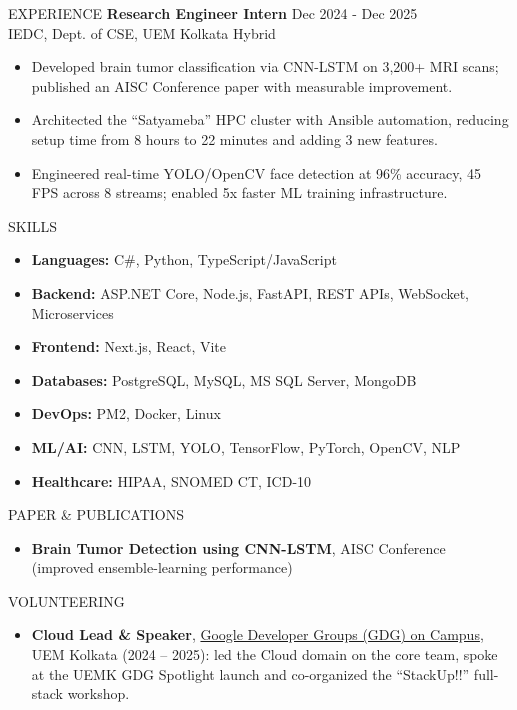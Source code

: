 \documentclass{resume}
\begin{document}
\begin{rSection}{EXPERIENCE}
{\bf Research Engineer Intern} \hfill {Dec 2024 - Dec 2025}\\
IEDC, Dept. of CSE, UEM Kolkata \hfill {Hybrid}
\begin{itemize}
  \item Developed brain tumor classification via CNN-LSTM on 3,200+ MRI scans; published an AISC Conference paper with measurable improvement.
  \item Architected the ``Satyameba'' HPC cluster with Ansible automation, reducing setup time from 8 hours to 22 minutes and adding 3 new features.
  \item Engineered real-time YOLO/OpenCV face detection at 96\% accuracy, 45 FPS across 8 streams; enabled 5x faster ML training infrastructure.
\end{itemize}

\end{rSection}
\vspace{-0.2cm}

\begin{rSection}{SKILLS}
\begin{itemize}
  \item \textbf{Languages:} C\#, Python, TypeScript/JavaScript
  \item \textbf{Backend:} ASP.NET Core, Node.js, FastAPI, REST APIs, WebSocket, Microservices
  \item \textbf{Frontend:} Next.js, React, Vite
  \item \textbf{Databases:} PostgreSQL, MySQL, MS SQL Server, MongoDB
  \item \textbf{DevOps:} PM2, Docker, Linux
  \item \textbf{ML/AI:} CNN, LSTM, YOLO, TensorFlow, PyTorch, OpenCV, NLP
  \item \textbf{Healthcare:} HIPAA, SNOMED CT, ICD-10 
\end{itemize}
\end{rSection}
\vspace{-0.2cm}

\begin{rSection}{PAPER \& PUBLICATIONS}
\begin{itemize}
  \item \textbf{Brain Tumor Detection using CNN-LSTM}, AISC Conference (improved ensemble-learning performance)
\end{itemize}
\end{rSection}
\vspace{-0.2cm}

\begin{rSection}{VOLUNTEERING}
\begin{itemize}
  \item \textbf{Cloud Lead \& Speaker}, \href{https://gdg.community.dev/gdg-on-campus-university-of-engineering-management-kolkata-india/}{Google Developer Groups (GDG) on Campus}, UEM Kolkata (2024 -- 2025): led the Cloud domain on the core team, spoke at the UEMK GDG Spotlight launch and co-organized the ``StackUp!!'' full-stack workshop.
\end{itemize}
\end{rSection}
\vspace{-0.2cm}
\end{document}
